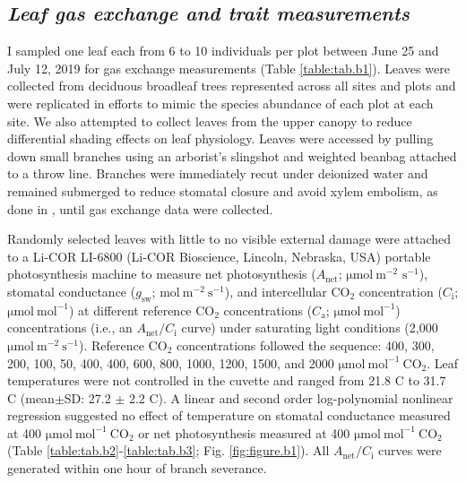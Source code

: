 \subsection{\textit{Leaf gas exchange and trait measurements}}
\noindent I sampled one leaf each from 6 to 10 individuals per plot between June 25 and July 12, 2019 for gas exchange measurements (Table \ref{table:tab.b1}). Leaves were collected from deciduous broadleaf trees represented across all sites and plots and were replicated in efforts to mimic the species abundance of each plot at each site. We also attempted to collect leaves from the upper canopy to reduce differential shading effects on leaf physiology. Leaves were accessed by pulling down small branches using an arborist’s slingshot and weighted beanbag attached to a throw line. Branches were immediately recut under deionized water and remained submerged to reduce stomatal closure and avoid xylem embolism, as done in , until gas exchange data were collected.

Randomly selected leaves with little to no visible external damage were attached to a Li-COR LI-6800 (Li-COR Bioscience, Lincoln, Nebraska, USA) portable photosynthesis machine to measure net photosynthesis ($A_\mathrm{net}$; $\mathrm{\mu mol\ m^{-2}}$ $\mathrm{{s}^{-1}}$), stomatal conductance ($g_\mathrm{sw}$; $\mathrm{mol\ m^{-2}\ s^{-1}}$), and intercellular CO$_2$ concentration ($C_\mathrm{i}$; $\mathrm{\mu mol\ mol^{-1}}$) at different reference CO$_2$ concentrations ($C_\mathrm{a}$; $\mathrm{\mu mol\ mol^{-1}}$) concentrations (i.e., an $A_\mathrm{net}/C_\mathrm{i}$ curve) under saturating light conditions (2,000 $\mathrm{\mu mol\ m^{-2}\ s^{-1}}$). Reference CO$_2$ concentrations followed the sequence: 400, 300, 200, 100, 50, 400, 400, 600, 800, 1000, 1200, 1500, and 2000 $\mathrm{\mu mol\ mol^{-1}\ CO_2}$. Leaf temperatures were not controlled in the cuvette and ranged from 21.8 \textdegree{}C to 31.7 \textdegree{}C (mean$\pm$SD: 27.2 $\pm$ 2.2 \textdegree{}C). A linear and second order log-polynomial nonlinear regression suggested no effect of temperature on stomatal conductance measured at 400 $\mathrm{\mu mol\ mol^{-1}\ CO_2}$ or net photosynthesis measured at 400 $\mathrm{\mu mol\ mol^{-1}\ CO_2}$ (Table \ref{table:tab.b2}-\ref{table:tab.b3}; Fig. \ref{fig:figure.b1}). All $A_\mathrm{net}/C_\mathrm{i}$ curves were generated within one hour of branch severance.


